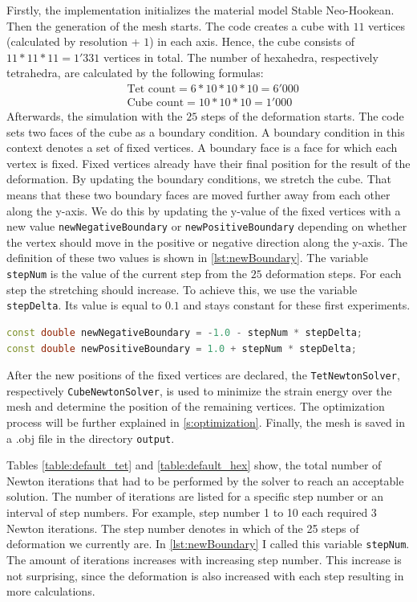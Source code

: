 Firstly, the implementation initializes the material model Stable Neo-Hookean. Then the generation of the mesh starts. The code creates a cube with $11$ vertices (calculated by resolution + $1$) in each axis. Hence, the cube consists of $11 * 11 * 11 = 1'331$ vertices in total. The number of hexahedra, respectively tetrahedra, are calculated by the following formulas:
\begin{align*}
	&\text{Tet count} = 6 * 10 * 10 * 10 = 6'000 \\
	&\text{Cube count} = 10 * 10 * 10 = 1'000
\end{align*}
Afterwards, the simulation with the $25$ steps of the deformation starts. The code sets two faces of the cube as a boundary condition. A boundary condition in this context denotes a set of fixed vertices. A boundary face is a face for which each vertex is fixed. Fixed vertices already have their final position for the result of the deformation. By updating the boundary conditions, we stretch the cube. That means that these two boundary faces are moved further away from each other along the y-axis. We do this by updating the y-value of the fixed vertices with a new value \verb|newNegativeBoundary| or \verb|newPositiveBoundary| depending on whether the vertex should move in the positive or negative direction along the y-axis. The definition of these two values is shown in \autoref{lst:newBoundary}. The variable \verb|stepNum| is the value of the current step from the $25$ deformation steps. For each step the stretching should increase. To achieve this, we use the variable \verb|stepDelta|. Its value is equal to $0.1$ and stays constant for these first experiments.
\begin{lstlisting}[language=C++, numbers=none, label=lst:newBoundary, caption=Updating y-coordinates of vertices, captionpos=b]
const double newNegativeBoundary = -1.0 - stepNum * stepDelta;
const double newPositiveBoundary = 1.0 + stepNum * stepDelta;
\end{lstlisting}
After the new positions of the fixed vertices are declared, the \verb|TetNewtonSolver|, respectively \verb|CubeNewtonSolver|, is used to minimize the strain energy over the mesh and determine the position of the remaining vertices. The optimization process will be further explained in \autoref{s:optimization}. Finally, the mesh is saved in a .obj file in the directory \verb|output|. 

Tables \ref{table:default_tet} and \ref{table:default_hex} show, the total number of Newton iterations that had to be performed by the solver to reach an acceptable solution. The number of iterations are listed for a specific step number or an interval of step numbers. For example, step number 1 to 10 each required 3 Newton iterations. The step number denotes in which of the 25 steps of deformation we currently are. In \autoref{lst:newBoundary} I called this variable \verb|stepNum|. The amount of iterations increases with increasing step number. This increase is not surprising, since the deformation is also increased with each step resulting in more calculations.

